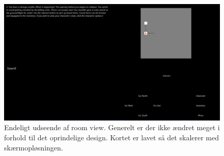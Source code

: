 \begin{figure}[H]
\centering
\includegraphics[width = \textwidth]{02-Body/Images/room_final.PNG}
\caption{Endeligt udseende af room view. Generelt er der ikke ændret meget i forhold til det oprindelige design. Kortet er lavet så det skalerer med skærmopløsningen.}
\label{fig:Design-FE-impl-room}
\end{figure}
